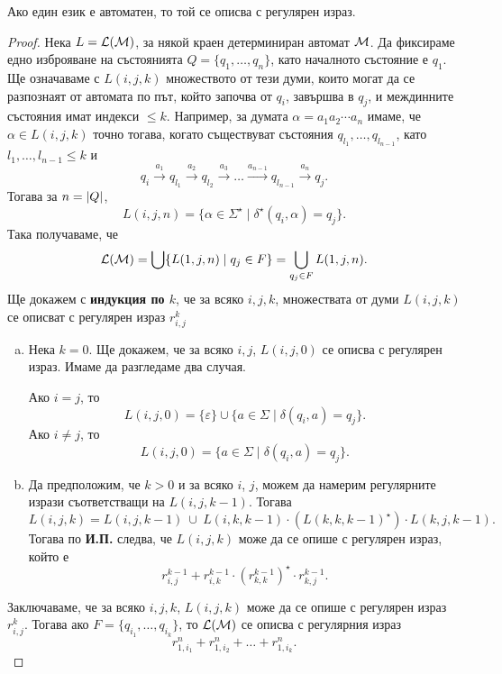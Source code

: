 \begin{framed}
\begin{thm}[Клини]
  Ако един език е автоматен, то той се описва с регулярен израз.
\end{thm}
\end{framed}
\begin{proof}
  Нека  $L = \mathcal{L}(\mathcal{M})$, за някой краен детерминиран автомат $\mathcal{M}$.
  Да фиксираме едно изброяване на състоянията $Q = \{q_1,\dots,q_n\}$,
  като началното състояние е $q_1$.
  Ще означаваме с $L(i,j,k)$ множеството от тези думи, които
  могат да се разпознаят от автомата по път, който започва от $q_i$,
  завършва в $q_j$, и междинните състояния имат индекси $\leq k$.
  Например, за думата $\alpha = a_1a_2\cdots a_n$ имаме, че $\alpha \in L(i,j,k)$
  точно тогава, когато съществуват състояния $q_{l_1},\dots,q_{l_{n-1}}$, като $l_1,\dots,l_{n-1} \leq k$ и
  \[q_i\stackrel{a_1}{\rightarrow} q_{l_1} \stackrel{a_2}{\rightarrow} q_{l_2} \stackrel{a_3}{\rightarrow} \dots \stackrel{a_{n-1}}{\rightarrow} q_{l_{n-1}}\stackrel{a_n}{\rightarrow} q_j.\]
  Тогава за $n = \lvert{Q}\rvert$, 
  \[L(i,j,n) = \{\alpha\in\Sigma^\star\mid \delta^\star(q_i,\alpha) = q_j\}.\]
  Така получаваме, че 
  \[\mathcal{L}(\mathcal{M}) = \bigcup\{L(1,j,n)\mid q_j \in F\} = \bigcup_{q_j\in F}L(1,j,n).\]
  Ще докажем с {\bf индукция по $k$}, че за всяко $i,j,k$, множествата от думи $L(i,j,k)$
  се описват с регулярен израз $r^k_{i,j}$
  \begin{enumerate}[a)]
  \item
    Нека $k = 0$. Ще докажем, че за всяко $i,j$, $L(i,j,0)$ се описва с регулярен израз.
    Имаме да разгледаме два случая.
    
    Ако $i = j$, то 
    \[L(i, j, 0) = \{\varepsilon\}\cup\{a\in\Sigma \mid \delta(q_i,a) = q_j\}.\]
    Ако $i \neq j$, то
    \[L(i, j, 0) = \{a\in\Sigma \mid \delta(q_i, a) = q_j\}.\]
  \item
    Да предположим, че $k > 0$ и за всяко $i$, $j$, можем да намерим регулярните изрази
    съответстващи на $L(i,j,k-1)$. Тогава
    \[L(i,j,k) = L(i,j,k-1)\ \cup\ L(i,k,k-1)\cdot (L(k,k,k-1)^\star) \cdot L(k,j,k-1).\]
    Тогава по {\bf И.П.} следва, че $L(i,j,k)$ може да се опише с регулярен израз, който е
    \[r^{k-1}_{i,j} + r^{k-1}_{i,k}\cdot (r^{k-1}_{k,k})^\star\cdot r^{k-1}_{k,j}.\]
  \end{enumerate}
  Заключаваме, че за всяко $i,j,k$, $L(i,j,k)$ може да се опише с регулярен израз $r^{k}_{i,j}$.
  Тогава ако $F = \{q_{i_1},\dots,q_{i_k}\}$, то $\mathcal{L}(\mathcal{M})$ се описва с регулярния израз
  \[r^n_{1,i_1} + r^n_{1,i_2} + \dots + r^n_{1,i_k}.\]
\end{proof}

